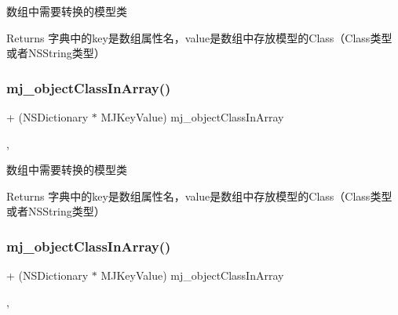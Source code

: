 数组中需要转换的模型类

\begin{DoxyReturn}{Returns}
字典中的key是数组属性名，value是数组中存放模型的\+Class（\+Class类型或者\+N\+S\+String类型） 
\end{DoxyReturn}
\mbox{\label{protocol_m_j_key_value_01-p_a296b17988a1fd2d7ff15b0e73e612a4e}} 
\subsubsection{\texorpdfstring{mj\+\_\+object\+Class\+In\+Array()}{mj\_objectClassInArray()}\hspace{0.1cm}{\footnotesize\ttfamily [2/3]}}
{\footnotesize\ttfamily + (N\+S\+Dictionary $\ast$ M\+J\+Key\+Value) mj\+\_\+object\+Class\+In\+Array \begin{DoxyParamCaption}{ }\end{DoxyParamCaption}\hspace{0.3cm}{\ttfamily [static]}, {\ttfamily [optional]}}

数组中需要转换的模型类

\begin{DoxyReturn}{Returns}
字典中的key是数组属性名，value是数组中存放模型的\+Class（\+Class类型或者\+N\+S\+String类型） 
\end{DoxyReturn}
\mbox{\label{protocol_m_j_key_value_01-p_a296b17988a1fd2d7ff15b0e73e612a4e}} 
\subsubsection{\texorpdfstring{mj\+\_\+object\+Class\+In\+Array()}{mj\_objectClassInArray()}\hspace{0.1cm}{\footnotesize\ttfamily [3/3]}}
{\footnotesize\ttfamily + (N\+S\+Dictionary $\ast$ M\+J\+Key\+Value) mj\+\_\+object\+Class\+In\+Array \begin{DoxyParamCaption}{ }\end{DoxyParamCaption}\hspace{0.3cm}{\ttfamily [static]}, {\ttfamily [optional]}}

